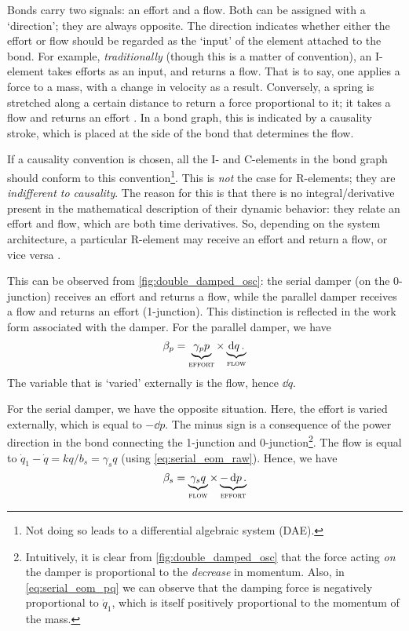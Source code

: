 Bonds carry two signals: an effort and a flow. Both can be assigned with a `direction'; they are always opposite. The direction indicates whether either the effort or flow should be regarded as the `input' of the element attached to the bond. For example, \emph{traditionally} (though this is a matter of convention), an I-element takes efforts as an input, and returns a flow. That is to say, one applies a force to a mass, with a change in velocity as a result. Conversely, a spring is stretched along a certain distance to return a force proportional to it; it takes a flow and returns an effort \cite{Borutzky2010}. In a bond graph, this is indicated by a causality stroke, which is placed at the side of the bond that determines the flow.

If a causality convention is chosen, all the I- and C-elements in the bond graph should conform to this convention\footnote{Not doing so leads to a differential algebraic system (DAE).}. This is \emph{not} the case for R-elements; they are \emph{indifferent to causality}. The reason for this is that there is no integral/derivative present in the mathematical description of their dynamic behavior: they relate an effort and flow, which are both time derivatives. So, depending on the system architecture, a particular R-element may receive an effort and return a flow, or vice versa \cite{Borutzky2010}.

This can be observed from \cref{fig:double_damped_osc}: the serial damper (on the 0-junction) receives an effort and returns a flow, while the parallel damper receives a flow and returns an effort (1-junction). This distinction is reflected in the work form associated with the damper. For the parallel damper, we have
\begin{equation}
     \beta_p = \underbrace{\gamma_p p}_\text{\textsc{effort}} \times \underbrace{\dd{q}.}_\text{\textsc{flow}}
\end{equation}
The variable that is `varied' externally is the flow, hence \(\dd{q}\).

For the serial damper, we have the opposite situation. Here, the effort is varied externally, which is equal to \(-\dd{p}\). The minus sign is a consequence of the power direction in the bond connecting the 1-junction and 0-junction\footnote{Intuitively, it is clear from \cref{fig:double_damped_osc} that the force acting \emph{on} the damper is proportional to the \emph{decrease} in momentum. Also, in \cref{eq:serial_eom_pq} we can observe that the damping force is negatively proportional to \(\dot{q}_1\), which is itself positively proportional to the momentum of the mass.}. The flow is equal to \(\dot{q}_1 - \dot{q} = kq/b_s = \gamma_s q\) (using \cref{eq:serial_eom_raw}). Hence, we have
\begin{equation}
     \beta_s = \underbrace{\gamma_s q}_\text{\textsc{flow}} \times \underbrace{-\dd{p}.}_\text{\textsc{effort}}
\end{equation}

